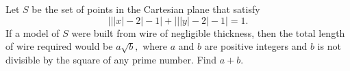 Let $ S$ be the set of points in the Cartesian plane that satisfy
\[ \Big|\big|{|x| - 2}\big| - 1\Big| + \Big|\big|{|y| - 2}\big| - 1\Big| = 1.
\]
If a model of $ S$ were built from wire of negligible thickness, then the total length of wire required would be $ a\sqrt {b},$ where $ a$ and $ b$ are positive integers and $ b$ is not divisible by the square of any prime number.  Find $ a + b.$